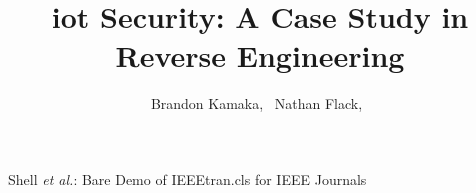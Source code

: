 \documentclass[journal]{IEEEtran}
\begin{document}
%
\title{\gls{iot} Security: A Case Study in Reverse Engineering}
%
%
%

\author{Brandon Kamaka,~
        Nathan Flack,~}%


% 
%



%
{Shell \MakeLowercase{\textit{et al.}}: Bare Demo of IEEEtran.cls for IEEE Journals}
% 
\end{document}
